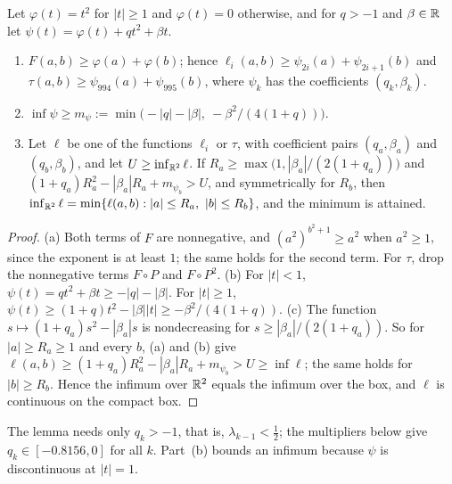 \begin{lemma}\label{lem:lukvle10-coercive}
Let $\varphi(t)=t^2$ for $|t|\ge1$ and $\varphi(t)=0$ otherwise, and for $q>-1$ and $\beta\in\mathbb{R}$ let $\psi(t)=\varphi(t)+qt^2+\beta t$.
\begin{enumerate}
\item[(a)] $F(a,b)\ge\varphi(a)+\varphi(b)$; hence $\ell_i(a,b)\ge\psi_{2i}(a)+\psi_{2i+1}(b)$ and $\tau(a,b)\ge\psi_{994}(a)+\psi_{995}(b)$, where $\psi_k$ has the coefficients $(q_k,\beta_k)$.
\item[(b)] $\inf\psi\ge m_\psi:=\min\bigl(-|q|-|\beta|,\ -\beta^2/(4(1+q))\bigr)$.
\item[(c)] Let $\ell$ be one of the functions $\ell_i$ or $\tau$, with coefficient pairs $(q_a,\beta_a)$ and $(q_b,\beta_b)$, and let $U\ge\inf_{\mathbb{R}^2}\ell$.
If $R_a\ge\max\bigl(1,|\beta_a|/(2(1+q_a))\bigr)$ and $(1+q_a)R_a^2-|\beta_a|R_a+m_{\psi_b}>U$, and symmetrically for $R_b$, then
$\inf_{\mathbb{R}^2}\ell=\min\{\ell(a,b):|a|\le R_a,\ |b|\le R_b\}$, and the minimum is attained.
\end{enumerate}
\end{lemma}

\begin{proof}
(a) Both terms of $F$ are nonnegative, and $(a^2)^{b^2+1}\ge a^2$ when $a^2\ge1$, since the exponent is at least $1$; the same holds for the second term.
For $\tau$, drop the nonnegative terms $F\circ P$ and $F\circ P^2$.
(b) For $|t|<1$, $\psi(t)=qt^2+\beta t\ge-|q|-|\beta|$.
For $|t|\ge1$, $\psi(t)\ge(1+q)t^2-|\beta||t|\ge-\beta^2/(4(1+q))$.
(c) The function $s\mapsto(1+q_a)s^2-|\beta_a|s$ is nondecreasing for $s\ge|\beta_a|/(2(1+q_a))$.
So for $|a|\ge R_a\ge1$ and every $b$, (a) and (b) give $\ell(a,b)\ge(1+q_a)R_a^2-|\beta_a|R_a+m_{\psi_b}>U\ge\inf\ell$; the same holds for $|b|\ge R_b$.
Hence the infimum over $\mathbb{R}^2$ equals the infimum over the box, and $\ell$ is continuous on the compact box.
\end{proof}

The lemma needs only $q_k>-1$, that is, $\lambda_{k-1}<\tfrac12$; the multipliers below give $q_k\in[-0.8156,0]$ for all $k$.
Part~(b) bounds an infimum because $\psi$ is discontinuous at $|t|=1$.

